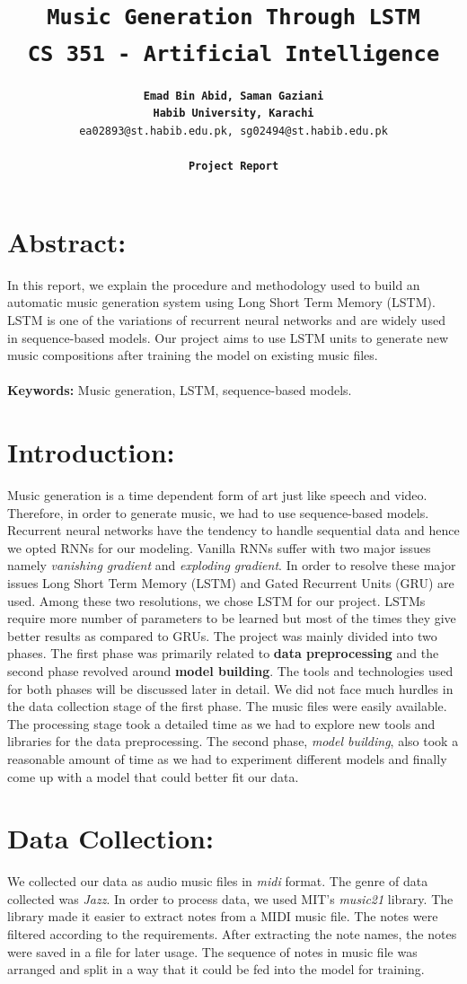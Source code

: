 \documentclass{proc}
\title{\textbf{\tt Music Generation Through LSTM}\\ \textbf{\tt CS 351 - Artificial Intelligence}}
\author{\textbf{\tt Emad Bin Abid, Saman Gaziani}\\ 
\textbf{\tt Habib University, Karachi} \\ {\tt ea02893@st.habib.edu.pk, sg02494@st.habib.edu.pk}\\ \\ {\tt \textbf{Project Report}}}
\begin{document}
\maketitle

\section*{Abstract:}
In this report, we explain the procedure and methodology used to build an automatic music generation system using Long Short Term Memory (LSTM). LSTM is one of the variations of recurrent neural networks and are widely used in sequence-based models. Our project aims to use LSTM units to generate new music compositions after training the model on existing music files. \\ \\
\textbf{Keywords:} Music generation, LSTM, sequence-based models. 

\section*{Introduction:}
Music generation is a time dependent form of art just like speech and video. Therefore, in order to generate music, we had to use sequence-based models. Recurrent neural networks have the tendency to handle sequential data and hence we opted RNNs for our modeling. Vanilla RNNs suffer with two major issues namely \textit{vanishing gradient} and \textit{exploding gradient}. In order to resolve these major issues Long Short Term Memory (LSTM) and Gated Recurrent Units (GRU) are used. Among these two resolutions, we chose LSTM for our project. LSTMs require more number of parameters to be learned but most of the times they give better results as compared to GRUs. The project was mainly divided into two phases. The first phase was primarily related to \textbf{data preprocessing} and the second phase revolved around \textbf{model building}. The tools and technologies used for both phases will be discussed later in detail. We did not face much hurdles in the data collection stage of the first phase. The music files were easily available. The processing stage took a detailed time as we had to explore new tools and libraries for the data preprocessing. The second phase, \textit{model building}, also took a reasonable amount of time as we had to experiment different models and finally come up with a model that could better fit our data. 

\section*{Data Collection:}
We collected our data as audio music files in \textit{midi} format. The genre of data collected was \textit{Jazz}. In order to process data, we used MIT's \textit{music21} library. The library made it easier to extract notes from a MIDI music file. The notes were filtered according to the requirements. After extracting the note names, the notes were saved in a file for later usage. The sequence of notes in music file was arranged and split in a way that it could be fed into the model for training. 
\end{document}
